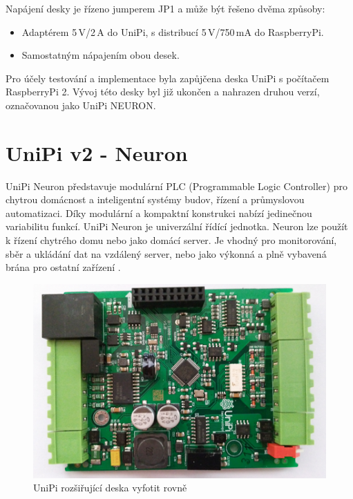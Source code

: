 Napájení desky je řízeno jumperem JP1 a může být řešeno dvěma způsoby:
\begin{itemize}
	\item Adaptérem 5\,V/2\,A do UniPi, s distribucí 5\,V/750\,mA do RaspberryPi.
	\item Samostatným nápajením obou desek.
\end{itemize}


Pro účely testování a implementace byla zapůjčena deska UniPi s počítačem RaspberryPi 2. Vývoj této desky byl již ukončen a nahrazen druhou verzí, označovanou jako UniPi NEURON.




\section{UniPi v2 - Neuron}
\label{KapitolaUnipi2}

UniPi Neuron představuje modulární PLC (Programmable Logic Controller) pro chytrou domácnost a inteligentní systémy budov, řízení a průmyslovou automatizaci. Díky modulární a kompaktní konstrukci nabízí jedinečnou variabilitu funkcí. UniPi Neuron je univerzální řídící jednotka. Neuron lze použít k řízení chytrého domu nebo jako domácí server. Je vhodný pro monitorování, sběr a ukládání dat na vzdálený server, nebo jako výkonná a plně vybavená brána pro ostatní zařízení \cite{UniPiBoard2}.

 \begin{figure}[!h]
  \begin{center}
    \includegraphics[scale=0.8]{obrazky/unipi_unipi_deska}
  \end{center}
  \caption{UniPi rozšiřující deska \colorbox[rgb]{0,1,0}{vyfotit rovně}}
\end{figure}

